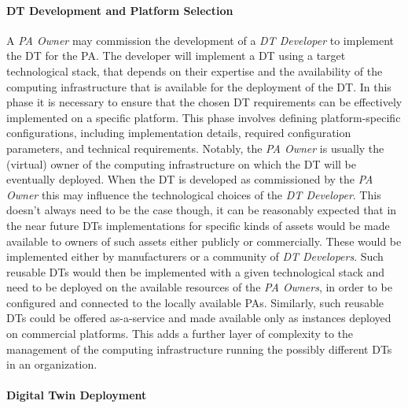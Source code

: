 \paragraph{DT Development and Platform Selection}

A \emph{\ac{PA} Owner} may commission the development of a \emph{DT Developer} to implement the DT for the PA. The developer will implement a DT using a target technological stack, that depends on their expertise and the availability of the computing infrastructure that is available for the deployment of the DT.
%
In this phase it is necessary to ensure that the chosen DT requirements can be effectively implemented on a specific platform.
%
This phase involves defining platform-specific configurations, including implementation details, required configuration parameters, and technical requirements.
%
Notably, the \emph{\ac{PA} Owner} is usually the (virtual) owner of the computing infrastructure on which the DT will be eventually deployed. When the DT is developed as commissioned by the \emph{\ac{PA} Owner} this may influence the technological choices of the \emph{\ac{DT} Developer}.
%
This doesn't always need to be the case though, it can be reasonably expected that in the near future \acp{DT} implementations for specific kinds of assets would be made available to owners of such assets either publicly or commercially.
These would be implemented either by manufacturers or a community of \emph{\ac{DT} Developers}.
Such reusable \acp{DT} would then be implemented with a given technological stack and need to be deployed on the available resources of the \emph{\ac{PA} Owners}, in order to be configured and connected to the locally available \acp{PA}. 
Similarly, such reusable \acp{DT} could be offered as-a-service and made available only as instances deployed on commercial platforms. This adds a further layer of complexity to the management of the computing infrastructure running the possibly different \acp{DT} in an organization.


\paragraph{Digital Twin Deployment}

